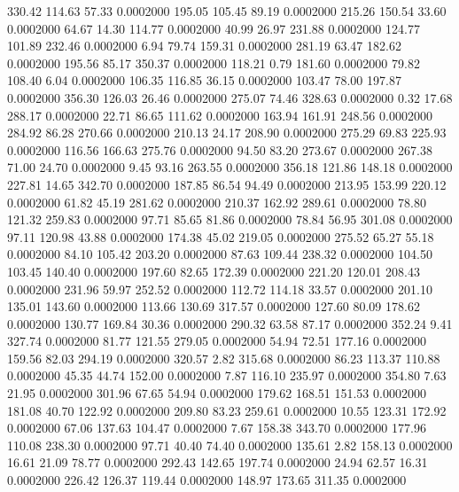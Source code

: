 330.42  114.63   57.33   0.0002000
 195.05  105.45   89.19   0.0002000
 215.26  150.54   33.60   0.0002000
  64.67   14.30  114.77   0.0002000
  40.99   26.97  231.88   0.0002000
 124.77  101.89  232.46   0.0002000
   6.94   79.74  159.31   0.0002000
 281.19   63.47  182.62   0.0002000
 195.56   85.17  350.37   0.0002000
 118.21    0.79  181.60   0.0002000
  79.82  108.40    6.04   0.0002000
 106.35  116.85   36.15   0.0002000
 103.47   78.00  197.87   0.0002000
 356.30  126.03   26.46   0.0002000
 275.07   74.46  328.63   0.0002000
   0.32   17.68  288.17   0.0002000
  22.71   86.65  111.62   0.0002000
 163.94  161.91  248.56   0.0002000
 284.92   86.28  270.66   0.0002000
 210.13   24.17  208.90   0.0002000
 275.29   69.83  225.93   0.0002000
 116.56  166.63  275.76   0.0002000
  94.50   83.20  273.67   0.0002000
 267.38   71.00   24.70   0.0002000
   9.45   93.16  263.55   0.0002000
 356.18  121.86  148.18   0.0002000
 227.81   14.65  342.70   0.0002000
 187.85   86.54   94.49   0.0002000
 213.95  153.99  220.12   0.0002000
  61.82   45.19  281.62   0.0002000
 210.37  162.92  289.61   0.0002000
  78.80  121.32  259.83   0.0002000
  97.71   85.65   81.86   0.0002000
  78.84   56.95  301.08   0.0002000
  97.11  120.98   43.88   0.0002000
 174.38   45.02  219.05   0.0002000
 275.52   65.27   55.18   0.0002000
  84.10  105.42  203.20   0.0002000
  87.63  109.44  238.32   0.0002000
 104.50  103.45  140.40   0.0002000
 197.60   82.65  172.39   0.0002000
 221.20  120.01  208.43   0.0002000
 231.96   59.97  252.52   0.0002000
 112.72  114.18   33.57   0.0002000
 201.10  135.01  143.60   0.0002000
 113.66  130.69  317.57   0.0002000
 127.60   80.09  178.62   0.0002000
 130.77  169.84   30.36   0.0002000
 290.32   63.58   87.17   0.0002000
 352.24    9.41  327.74   0.0002000
  81.77  121.55  279.05   0.0002000
  54.94   72.51  177.16   0.0002000
 159.56   82.03  294.19   0.0002000
 320.57    2.82  315.68   0.0002000
  86.23  113.37  110.88   0.0002000
  45.35   44.74  152.00   0.0002000
   7.87  116.10  235.97   0.0002000
 354.80    7.63   21.95   0.0002000
 301.96   67.65   54.94   0.0002000
 179.62  168.51  151.53   0.0002000
 181.08   40.70  122.92   0.0002000
 209.80   83.23  259.61   0.0002000
  10.55  123.31  172.92   0.0002000
  67.06  137.63  104.47   0.0002000
   7.67  158.38  343.70   0.0002000
 177.96  110.08  238.30   0.0002000
  97.71   40.40   74.40   0.0002000
 135.61    2.82  158.13   0.0002000
  16.61   21.09   78.77   0.0002000
 292.43  142.65  197.74   0.0002000
  24.94   62.57   16.31   0.0002000
 226.42  126.37  119.44   0.0002000
 148.97  173.65  311.35   0.0002000
